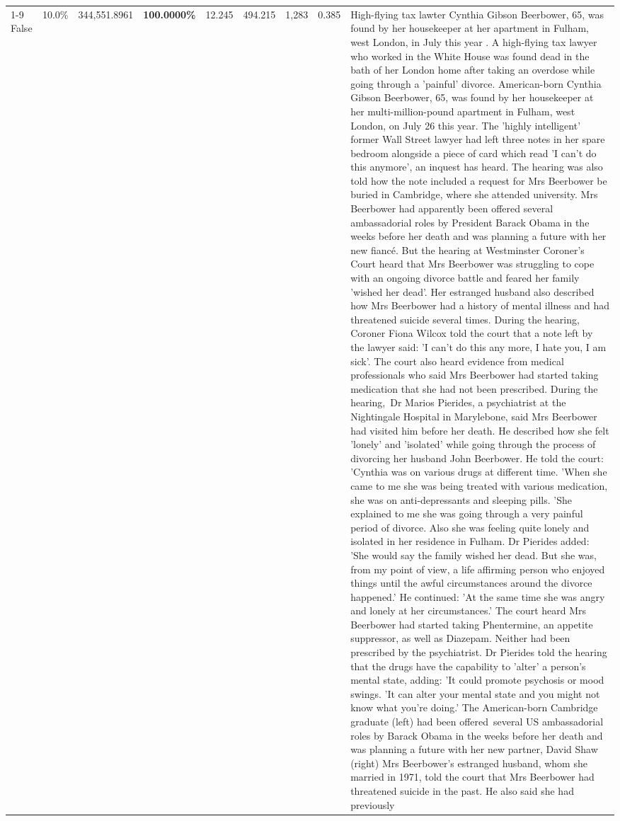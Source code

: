 \begin{table}[H]
\begin{tabular}{lllrlllll}
\cline{1-9}
False & 10.0\% & 344,551.8961 & \bfseries \color{red} 100.0000\% & 12.245 & 494.215 & 1,283 & 0.385 & High-flying tax lawter Cynthia Gibson Beerbower, 65, was found by her housekeeper at her apartment in Fulham, west London, in July this year . A high-flying tax lawyer who worked in the White House was found dead in the bath of her London home after taking an overdose while going through a 'painful' divorce. American-born Cynthia Gibson Beerbower, 65, was found by her housekeeper at her multi-million-pound apartment in Fulham, west London, on July 26 this year. The 'highly intelligent' former Wall Street lawyer had left three notes in her spare bedroom alongside a piece of card which read 'I can't do this anymore', an inquest has heard. The hearing was also told how the note included a request for Mrs Beerbower be buried in Cambridge, where she attended university. Mrs Beerbower had apparently been offered several ambassadorial roles by President Barack Obama in the weeks before her death and was planning a future with her new fiancé. But the hearing at Westminster Coroner's Court heard that Mrs Beerbower was struggling to cope with an ongoing divorce battle and feared her family 'wished her dead'. Her estranged husband also described how Mrs Beerbower had a history of mental illness and had threatened suicide several times. During the hearing, Coroner Fiona Wilcox told the court that a note left by the lawyer said: 'I can't do this any more, I hate you, I am sick'. The court also heard evidence from medical professionals who said Mrs Beerbower had started taking medication that she had not been prescribed. During the hearing, Dr Marios Pierides, a psychiatrist at the Nightingale Hospital in Marylebone, said Mrs Beerbower had visited him before her death. He described how she felt 'lonely' and 'isolated' while going through the process of divorcing her husband John Beerbower. He told the court: 'Cynthia was on various drugs at different time. 'When she came to me she was being treated with various medication, she was on anti-depressants and sleeping pills. 'She explained to me she was going through a very painful period of divorce. Also she was feeling quite lonely and isolated in her residence in Fulham. Dr Pierides added: 'She would say the family wished her dead. But she was, from my point of view, a life affirming person who enjoyed things until the awful circumstances around the divorce happened.' He continued: 'At the same time she was angry and lonely at her circumstances.' The court heard Mrs Beerbower had started taking Phentermine, an appetite suppressor, as well as Diazepam. Neither had been prescribed by the psychiatrist. Dr Pierides told the hearing that the drugs have the capability to 'alter' a person's mental state, adding: 'It could promote psychosis or mood swings. 'It can alter your mental state and you might not know what you're doing.' The American-born Cambridge graduate (left) had been offered several US ambassadorial roles by Barack Obama in the weeks before her death and was planning a future with her new partner, David Shaw (right) Mrs Beerbower's estranged husband, whom she married in 1971, told the court that Mrs Beerbower had threatened suicide in the past. He also said she had previously 
\end{tabular}
\end{table}
